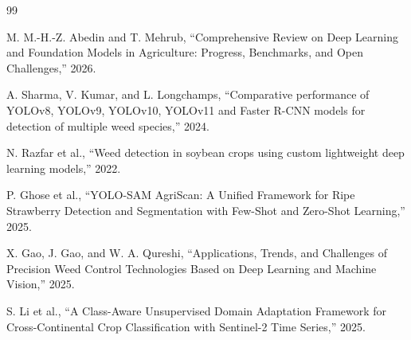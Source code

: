 %
%
\begin{singlespace}
\setlength{\parskip}{12pt}


\begin{thebibliography}{99}
	
M. M.-H.-Z. Abedin and T. Mehrub, ``Comprehensive Review on Deep Learning and Foundation Models in Agriculture: Progress, Benchmarks, and Open Challenges,'' 2026.

A. Sharma, V. Kumar, and L. Longchamps, ``Comparative performance of YOLOv8, YOLOv9, YOLOv10, YOLOv11 and Faster R-CNN models for detection of multiple weed species,'' 2024.

N. Razfar et al., ``Weed detection in soybean crops using custom lightweight deep learning models,'' 2022.

P. Ghose et al., ``YOLO-SAM AgriScan: A Unified Framework for Ripe Strawberry Detection and Segmentation with Few-Shot and Zero-Shot Learning,'' 2025.

X. Gao, J. Gao, and W. A. Qureshi, ``Applications, Trends, and Challenges of Precision Weed Control Technologies Based on Deep Learning and Machine Vision,'' 2025.

S. Li et al., ``A Class-Aware Unsupervised Domain Adaptation Framework for Cross-Continental Crop Classification with Sentinel-2 Time Series,'' 2025.


\end{thebibliography}
\end{singlespace}
